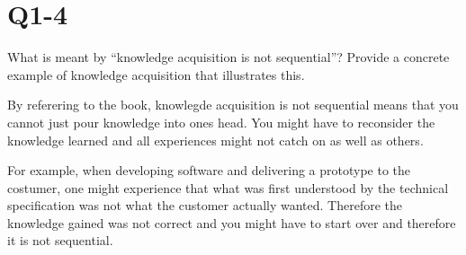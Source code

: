 \section{Q1-4}
What is meant by “knowledge acquisition is not sequential”? Provide a concrete example of knowledge acquisition that illustrates this.

By referering to the book, knowlegde acquisition is not sequential means that you cannot just pour knowledge into ones head. You might have to reconsider the knowledge learned and all experiences might not catch on as well as others.

For example, when developing software and delivering a prototype to the costumer, one might experience that what was first understood by the technical specification was not what the customer actually wanted. Therefore the knowledge gained was not correct and you might have to start over and therefore it is not sequential.
